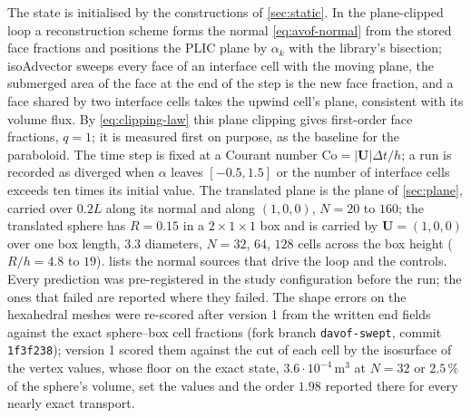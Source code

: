 \documentclass[preprint,12pt]{elsarticle}
\begin{document}
The state is initialised by the constructions of \cref{sec:static}. In the plane-clipped loop a reconstruction scheme forms the normal \cref{eq:avof-normal} from the stored face fractions and positions the PLIC plane by $\alpha_k$ with the library's bisection; isoAdvector sweeps every face of an interface cell with the moving plane, the submerged area of the face at the end of the step is the new face fraction, and a face shared by two interface cells takes the upwind cell's plane, consistent with its volume flux. By \cref{eq:clipping-law} this plane clipping gives first-order face fractions, $q = 1$; it is measured first on purpose, as the baseline for the paraboloid. The time step is fixed at a Courant number $\mathrm{Co} = |\mathbf{U}|\Delta t/h$; a run is recorded as diverged when $\alpha$ leaves $[-0.5, 1.5]$ or the number of interface cells exceeds ten times its initial value. The translated plane is the plane of \cref{sec:plane}, carried over $0.2L$ along its normal and along $(1, 0, 0)$, $N = 20$ to $160$; the translated sphere has $R = 0.15$ in a $2 \times 1 \times 1$ box and is carried by $\mathbf{U} = (1, 0, 0)$ over one box length, 3.3 diameters, $N = 32$, $64$, $128$ cells across the box height ($R/h = 4.8$ to $19$).  lists the normal sources that drive the loop and the controls. Every prediction was pre-registered in the study configuration before the run; the ones that failed are reported where they failed. The shape errors on the hexahedral meshes were re-scored after version 1 from the written end fields against the exact sphere--box cell fractions (fork branch \texttt{davof-swept}, commit \texttt{1f3f238}); version 1 scored them against the cut of each cell by the isosurface of the vertex values, whose floor on the exact state, $3.6\cdot10^{-4}\,\mathrm{m^3}$ at $N = 32$ or $2.5\,\%$ of the sphere's volume, set the values and the order $1.98$ reported there for every nearly exact transport.
\end{document}
